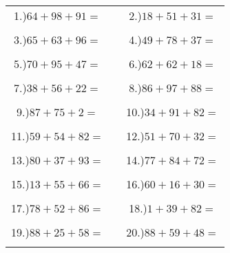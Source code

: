\documentclass{article}
\begin{document}
\begin{tabular}{ccc}
1.)$64+98+91=$& \hspace{5cm} &2.)$18+51+31=$\\\\
3.)$65+63+96=$& \hspace{5cm} &4.)$49+78+37=$\\\\
5.)$70+95+47=$& \hspace{5cm} &6.)$62+62+18=$\\\\
7.)$38+56+22=$& \hspace{5cm} &8.)$86+97+88=$\\\\
9.)$87+75+2=$& \hspace{5cm} &10.)$34+91+82=$\\\\
11.)$59+54+82=$& \hspace{5cm} &12.)$51+70+32=$\\\\
13.)$80+37+93=$& \hspace{5cm} &14.)$77+84+72=$\\\\
15.)$13+55+66=$& \hspace{5cm} &16.)$60+16+30=$\\\\
17.)$78+52+86=$& \hspace{5cm} &18.)$1+39+82=$\\\\
19.)$88+25+58=$& \hspace{5cm} &20.)$88+59+48=$\\\\
\end{tabular}
\newpage
\end{document}
